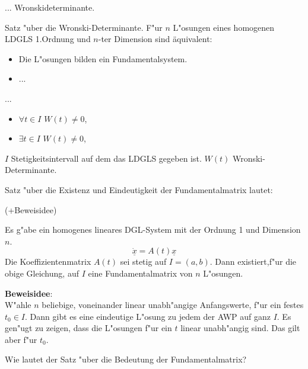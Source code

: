 \documentclass[9pt]{article}
\renewcommand{\vec}[1]{\underline{#1}}
\newenvironment{field}{}{\newpage}
\newif\ifnote
\newenvironment{note}{\notetrue}{\notefalse}
\begin{document}
\begin{note}
	\begin{field}  %
		... Wronskideterminante.
	\end{field}
		
	\begin{field}  %
		Satz "uber die Wronski-Determinante.
		F"ur $n$ L"osungen eines homogenen LDGLS 1.Ordnung und $n$-ter Dimension sind äquivalent: 
		\begin{itemize}
			\item Die L"osungen bilden ein Fundamentalsystem.
			\item ...
		\end{itemize}  
	\end{field}
	
	\begin{field}  %
		...
		\begin{itemize}
			\item $\forall t \in I$ $W(t)\neq0$,
			\item $\exists t \in I$ $W(t)\neq0$,
		\end{itemize}
	$I$ Stetigkeitsintervall auf dem das LDGLS gegeben ist.
	$W(t)$ Wronski-Determinante.
	\end{field}
		
	\begin{field}  %
		Satz "uber die Existenz und Eindeutigkeit der Fundamentalmatrix lautet:
		
		(+Beweisidee)
	\end{field}

	\begin{field}  %
		Es g"abe ein homogenes lineares DGL-System mit der Ordnung 1 und Dimension $n$.
		\begin{equation*}
			\dot{\vec{x}} = A(t)\vec{x} 
		\end{equation*}
		Die Koeffizientenmatrix  $A(t)$ sei stetig auf $I=(a,b)$. Dann existiert,f"ur die obige Gleichung, auf $I$ eine Fundamentalmatrix von $n$ L"osungen.
		
		\textbf{Beweisidee}: \\
		W"ahle $n$ beliebige, voneinander linear unabh"angige Anfangswerte, f"ur ein festes $t_0 \in I$. Dann gibt es
		eine eindeutige L"osung zu jedem der AWP auf ganz $I$. 
		Es gen"ugt zu zeigen, dass die L"osungen f"ur ein $t$ 
		linear unabh"angig sind. Das gilt aber f"ur $t_0$.
	\end{field}
		
	\begin{field}  %
		Wie lautet der Satz "uber die Bedeutung der Fundamentalmatrix?
	\end{field}
	

\end{note}
\end{document}
